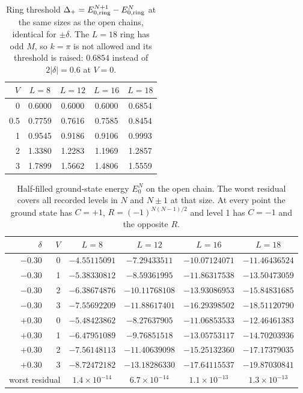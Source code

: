 \documentclass[11pt,a4paper]{article}
\begin{document}
\begin{table}[t]
  \centering
  \footnotesize
  \begin{tabular}{rcccc}
    \toprule
    $V$ & $L=8$ & $L=12$ & $L=16$ & $L=18$ \\
    \midrule
    0   & 0.6000 & 0.6000 & 0.6000 & 0.6854 \\
    0.5 & 0.7759 & 0.7616 & 0.7585 & 0.8454 \\
    1   & 0.9545 & 0.9186 & 0.9106 & 0.9993 \\
    2   & 1.3380 & 1.2283 & 1.1969 & 1.2857 \\
    3   & 1.7899 & 1.5662 & 1.4806 & 1.5559 \\
    \bottomrule
  \end{tabular}
  \caption{Ring threshold $\Delta_+=E_{0,\rm ring}^{N+1}-E_{0,\rm ring}^{N}$ at the same sizes as the open chains, identical for $\pm\delta$.
  The $L=18$ ring has odd $M$, so $k=\pi$ is not allowed and its threshold is raised: $0.6854$ instead of $2|\delta|=0.6$ at $V=0$.}
  \label{tab:rings}
\end{table}

\begin{table}[t]
  \centering
  \footnotesize
  \begin{tabular}{rrcccc}
    \toprule
    $\delta$ & $V$ & $L=8$ & $L=12$ & $L=16$ & $L=18$ \\
    \midrule
    $-0.30$ & 0 & $-4.55115091$ & $-7.29433511$ & $-10.07124071$ & $-11.46436524$ \\
    $-0.30$ & 1 & $-5.38330812$ & $-8.59361995$ & $-11.86317538$ & $-13.50473059$ \\
    $-0.30$ & 2 & $-6.38674876$ & $-10.11768108$ & $-13.93086953$ & $-15.84831685$ \\
    $-0.30$ & 3 & $-7.55692209$ & $-11.88617401$ & $-16.29398502$ & $-18.51120790$ \\
    \midrule
    $+0.30$ & 0 & $-5.48423862$ & $-8.27637905$ & $-11.06853533$ & $-12.46461383$ \\
    $+0.30$ & 1 & $-6.47951089$ & $-9.76851518$ & $-13.05753117$ & $-14.70203936$ \\
    $+0.30$ & 2 & $-7.56148113$ & $-11.40639098$ & $-15.25132360$ & $-17.17379035$ \\
    $+0.30$ & 3 & $-8.72472182$ & $-13.18286330$ & $-17.64115537$ & $-19.87030841$ \\
    \midrule
    \multicolumn{2}{r}{worst residual} & $1.4\times10^{-14}$ & $6.7\times10^{-14}$ & $1.1\times10^{-13}$ & $1.3\times10^{-13}$ \\
    \bottomrule
  \end{tabular}
  \caption{Half-filled ground-state energy $E_0^N$ on the open chain.
  The worst residual covers all recorded levels in $N$ and $N\pm1$ at that size.
  At every point the ground state has $C=+1$, $R=(-1)^{N(N-1)/2}$ and level 1 has $C=-1$ and the opposite $R$.}
  \label{tab:e0}
\end{table}
\end{document}
